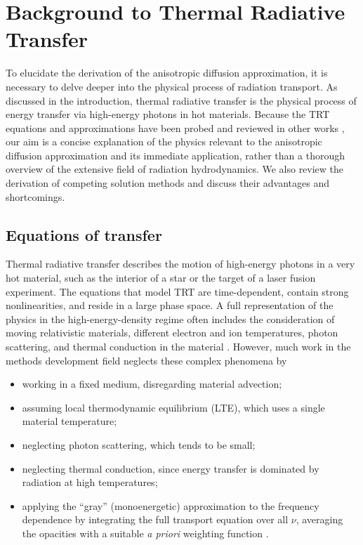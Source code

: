 
\chapter{Background to Thermal Radiative Transfer}\label{chap:trtBackground}

To elucidate the derivation of the anisotropic
diffusion approximation, it is necessary to delve deeper into the physical
process of radiation transport. As discussed in the introduction,
thermal radiative transfer is the physical process of energy transfer via
high-energy photons in hot materials. Because the TRT equations and
approximations have been probed and reviewed in other works
\cite{Mih1984,Pom1973,Cas2004,Wol2008}, our aim is a concise explanation of the
physics relevant to the anisotropic diffusion approximation and its immediate
application, rather than a thorough overview of the extensive field of radiation
hydrodynamics. We also review the derivation of competing solution methods and
discuss their advantages and shortcomings.

\section{Equations of transfer}\label{sec:bgTrtEquations}
Thermal radiative transfer describes the motion of high-energy photons
in a very hot material, such as the interior of a star or the target of a laser
fusion experiment. The equations that model TRT are time-dependent, contain
strong nonlinearities, and reside in a large phase space.
A full representation of the physics in
the high-energy-density regime often includes the consideration of moving
relativistic materials, different electron and ion temperatures, photon
scattering, and thermal conduction in the material \cite{Mih1984}. However,
much work in the methods development field neglects these complex phenomena by
\begin{itemize}
  \item working in a fixed medium, disregarding material advection;
  \item assuming local thermodynamic equilibrium (LTE), which uses a single
    material temperature;
  \item neglecting photon scattering, which tends to be small;
  \item neglecting thermal conduction, since energy transfer is dominated by
    radiation at high temperatures;
  \item applying the ``gray'' (monoenergetic) approximation to the frequency
    dependence by integrating the full transport equation over all $\nu$, averaging 
    the
    opacities with a suitable \emph{a priori} weighting function \cite{Lar1983a}.
\end{itemize}

